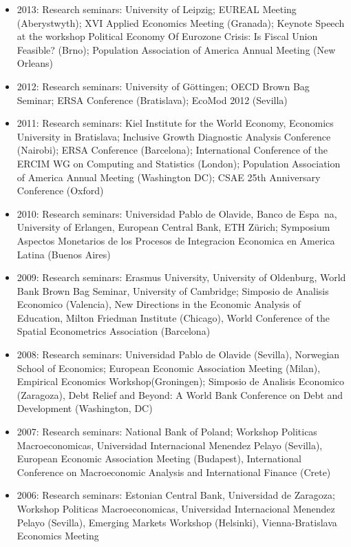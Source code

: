 \documentclass[10pt]{res} %
\begin{document}
\begin{resume}
\begin{itemize}
(Kao Lak); IAAE 2014 (London); ERSA Congress (St Petersburg); Conference
in Honour of Eduardo Ley, The World Bank
\item 2013: Research seminars: University of Leipzig; EUREAL Meeting (Aberystwyth);
XVI Applied Economics Meeting (Granada); Keynote Speech at the workshop Political
Economy Of Eurozone Crisis: Is Fiscal Union Feasible? (Brno); Population Association
of America Annual Meeting (New Orleans)
\item 2012: Research seminars: University of G\"ottingen; OECD Brown Bag Seminar; ERSA
Conference (Bratislava); EcoMod 2012 (Sevilla)
\item 2011: Research seminars: Kiel Institute for the World Economy, Economics University
in Bratislava; Inclusive Growth Diagnostic Analysis Conference (Nairobi); ERSA Conference
(Barcelona); International Conference of the ERCIM WG on Computing and
Statistics (London); Population Association of America Annual Meeting (Washington
DC); CSAE 25th Anniversary Conference (Oxford)
\item 2010: Research seminars: Universidad Pablo de Olavide, Banco de Espa~na, University
of Erlangen, European Central Bank, ETH Z\"urich; Symposium Aspectos Monetarios
de los Procesos de Integracion Economica en America Latina (Buenos Aires)
\item 2009: Research seminars: Erasmus University, University of Oldenburg, World Bank
Brown Bag Seminar, University of Cambridge; Simposio de Analisis Economico (Valencia),
New Directions in the Economic Analysis of Education, Milton Friedman Institute
(Chicago), World Conference of the Spatial Econometrics Association (Barcelona)
\item 2008: Research seminars: Universidad Pablo de Olavide (Sevilla), Norwegian School
of Economics; European Economic Association Meeting (Milan), Empirical Economics
Workshop(Groningen); Simposio de Analisis Economico (Zaragoza), Debt Relief and
Beyond: A World Bank Conference on Debt and Development (Washington, DC)
\item 2007: Research seminars: National Bank of Poland; Workshop Politicas Macroeconomicas, Universidad Internacional Menendez Pelayo (Sevilla), European Economic
Association Meeting (Budapest), International Conference on Macroeconomic Analysis
and International Finance (Crete)
\item 2006: Research seminars: Estonian Central Bank, Universidad de Zaragoza; Workshop
Politicas Macroeconomicas, Universidad Internacional Menendez Pelayo (Sevilla),
Emerging Markets Workshop (Helsinki), Vienna-Bratislava Economics Meeting

\end{itemize}
\end{resume}
\end{document}
